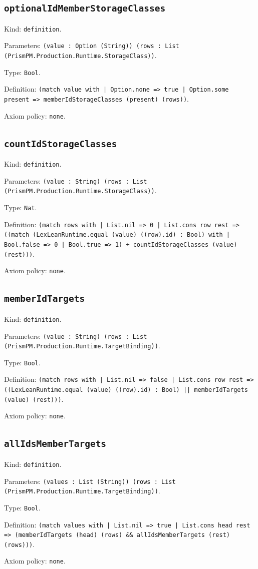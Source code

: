 \documentclass[11pt]{article}
\begin{document}
\subsection*{\texttt{optionalIdMemberStorageClasses}}
\noindent Kind: \texttt{definition}.\par
\noindent Parameters: \texttt{(value : Option (String)) (rows : List (PrismPM.Production.Runtime.StorageClass))}.\par
\noindent Type: \texttt{Bool}.\par
\noindent Definition: \texttt{(match value with | Option.none => true | Option.some present => memberIdStorageClasses (present) (rows))}.\par
\noindent Axiom policy: \texttt{none}.\par
\subsection*{\texttt{countIdStorageClasses}}
\noindent Kind: \texttt{definition}.\par
\noindent Parameters: \texttt{(value : String) (rows : List (PrismPM.Production.Runtime.StorageClass))}.\par
\noindent Type: \texttt{Nat}.\par
\noindent Definition: \texttt{(match rows with | List.nil => 0 | List.cons row rest => ((match (LexLeanRuntime.equal (value) ((row).id) : Bool) with | Bool.false => 0 | Bool.true => 1) + countIdStorageClasses (value) (rest)))}.\par
\noindent Axiom policy: \texttt{none}.\par
\subsection*{\texttt{memberIdTargets}}
\noindent Kind: \texttt{definition}.\par
\noindent Parameters: \texttt{(value : String) (rows : List (PrismPM.Production.Runtime.TargetBinding))}.\par
\noindent Type: \texttt{Bool}.\par
\noindent Definition: \texttt{(match rows with | List.nil => false | List.cons row rest => ((LexLeanRuntime.equal (value) ((row).id) : Bool) || memberIdTargets (value) (rest)))}.\par
\noindent Axiom policy: \texttt{none}.\par
\subsection*{\texttt{allIdsMemberTargets}}
\noindent Kind: \texttt{definition}.\par
\noindent Parameters: \texttt{(values : List (String)) (rows : List (PrismPM.Production.Runtime.TargetBinding))}.\par
\noindent Type: \texttt{Bool}.\par
\noindent Definition: \texttt{(match values with | List.nil => true | List.cons head rest => (memberIdTargets (head) (rows) \&\& allIdsMemberTargets (rest) (rows)))}.\par
\noindent Axiom policy: \texttt{none}.\par
\end{document}
